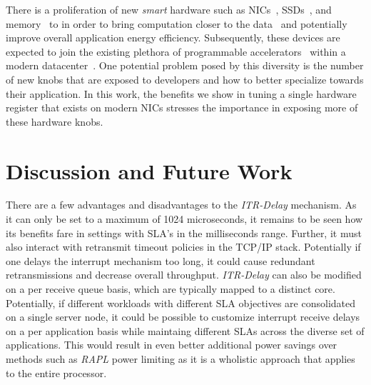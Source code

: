 \documentclass[letterpaper,twocolumn,10pt]{article}
\begin{document}
There is a proliferation of new \textit{smart} hardware such as NICs~\cite{netronome, mellanoxsnic}, SSDs~\cite{biscuit}, and memory~\cite{dpu} to in order to bring computation closer to the data~\cite{neardataprocess, ndp1} and potentially improve overall application energy efficiency. Subsequently, these devices are expected to join the existing plethora of programmable accelerators~\cite{msrfpga, tpu} within a modern datacenter~\cite{silberstein1}. One potential problem posed by this diversity is the number of new knobs that are exposed to developers and how to better specialize towards their application. In this work, the benefits we show in tuning a single hardware register that exists on modern NICs stresses the importance in exposing more of these hardware knobs.

\section{Discussion and Future Work}
There are a few advantages and disadvantages to the \textit{ITR-Delay} mechanism. As it can only be set to a maximum of 1024 microseconds, it remains to be seen how its benefits fare in settings with SLA's in the milliseconds range. Further, it must also interact with retransmit timeout policies in the TCP/IP stack. Potentially if one delays the interrupt mechanism too long, it could cause redundant retransmissions and decrease overall throughput. \textit{ITR-Delay} can also be modified on a per receive queue basis, which are typically mapped to a distinct core. Potentially, if different workloads with different SLA objectives are consolidated on a single server node, it could be possible to customize interrupt receive delays on a per application basis while maintaing different SLAs across the diverse set of applications. This would result in even better additional power savings over methods such as \textit{RAPL} power limiting as it is a wholistic approach that applies to the entire processor.
\end{document}
